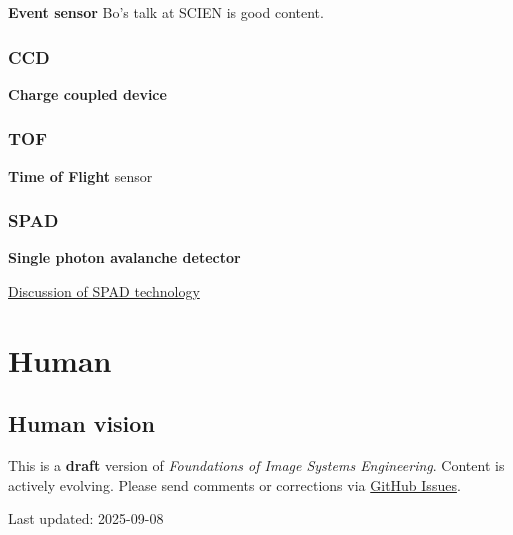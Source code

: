 \documentclass[
  letterpaper,
]{book}
\begin{document}
\textbf{Event sensor} Bo's talk at SCIEN is good content.

\section{CCD}\label{sec-sensor-ccd}

\textbf{Charge coupled device}

\section{TOF}\label{sec-sensor-tof}

\textbf{Time of Flight} sensor

\section{SPAD}\label{sec-sensor-spad}

\textbf{Single photon avalanche detector}

\href{https://g.co/gemini/share/1618a5d47f5a}{Discussion of SPAD
technology}

\part{Human}

\chapter{Human vision}\label{sec-human}

\begin{tcolorbox}[enhanced jigsaw, colframe=quarto-callout-warning-color-frame, titlerule=0mm, rightrule=.15mm, opacitybacktitle=0.6, colback=white, leftrule=.75mm, coltitle=black, title=\textcolor{quarto-callout-warning-color}{\faExclamationTriangle}\hspace{0.5em}{Work in Progress}, bottomrule=.15mm, colbacktitle=quarto-callout-warning-color!10!white, breakable, left=2mm, bottomtitle=1mm, toptitle=1mm, opacityback=0, arc=.35mm, toprule=.15mm]

This is a \textbf{draft} version of \emph{Foundations of Image Systems
Engineering}. Content is actively evolving. Please send comments or
corrections via \href{https://github.com/wandell/FISE-git/issues}{GitHub
Issues}.

Last updated: 2025-09-08

\end{tcolorbox}
\end{document}
